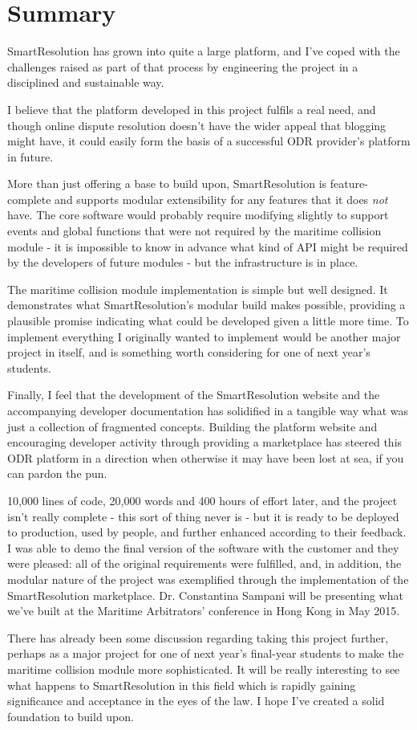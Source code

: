 \section{Summary}

SmartResolution has grown into quite a large platform, and I've coped with the challenges raised as part of that process by engineering the project in a disciplined and sustainable way.

I believe that the platform developed in this project fulfils a real need, and though online dispute resolution doesn't have the wider appeal that blogging might have, it could easily form the basis of a successful ODR provider's platform in future.

More than just offering a base to build upon, SmartResolution is feature-complete and supports modular extensibility for any features that it does \emph{not} have. The core software would probably require modifying slightly to support events and global functions that were not required by the maritime collision module - it is impossible to know in advance what kind of API might be required by the developers of future modules - but the infrastructure is in place.

The maritime collision module implementation is simple but well designed. It demonstrates what SmartResolution's modular build makes possible, providing a plausible promise indicating what could be developed given a little more time. To implement everything I originally wanted to implement would be another major project in itself, and is something worth considering for one of next year's students.

Finally, I feel that the development of the SmartResolution website and the accompanying developer documentation has solidified in a tangible way what was just a collection of fragmented concepts. Building the platform website and encouraging developer activity through providing a marketplace has steered this ODR platform in a direction when otherwise it may have been lost at sea, if you can pardon the pun.

10,000 lines of code, 20,000 words and 400 hours of effort later, and the project isn't really complete - this sort of thing never is - but it is ready to be deployed to production, used by people, and further enhanced according to their feedback. I was able to demo the final version of the software with the customer and they were pleased: all of the original requirements were fulfilled, and, in addition, the modular nature of the project was exemplified through the implementation of the SmartResolution marketplace. Dr. Constantina Sampani will be presenting what we've built at the Maritime Arbitrators' conference in Hong Kong in May 2015.

There has already been some discussion regarding taking this project further, perhaps as a major project for one of next year's final-year students to make the maritime collision module more sophisticated. It will be really interesting to see what happens to SmartResolution in this field which is rapidly gaining significance and acceptance in the eyes of the law. I hope I've created a solid foundation to build upon.